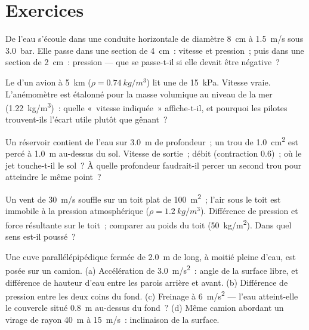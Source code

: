 \section{Exercices}

\begin{exercise}[$\star$]\label{exo:b2:euler-bernoulli:1}
De l'eau s'écoule dans une conduite horizontale de diamètre \qty{8}{cm} à \qty{1.5}{m/s}
sous \qty{3.0}{bar}. Elle passe dans une section de \qty{4}{cm}~: vitesse
et pression~; puis dans une section de \qty{2}{cm}~: pression --- que se passe-t-il
si elle devait être négative~?
\end{exercise}

\begin{exercise}[$\star$]\label{exo:b2:euler-bernoulli:2}
Le  d'un avion à \qty{5}{km} ($\rho = \qty{0.74}{kg/m^3}$)
lit une  de \qty{15}{kPa}. Vitesse vraie. L'anémomètre
est étalonné pour la masse volumique au niveau de la mer (\qty{1.22}{kg/m^3})~: quelle
«~vitesse indiquée~» affiche-t-il, et pourquoi les pilotes trouvent-ils l'écart
utile plutôt que gênant~?
\end{exercise}

\begin{exercise}[$\star$]\label{exo:b2:euler-bernoulli:3}
Un réservoir contient de l'eau sur \qty{3.0}{m} de profondeur~; un trou de \qty{1.0}{cm^2} est percé
à \qty{1.0}{m} au-dessus du sol. Vitesse de sortie~; débit (contraction $0.6$)~;
où le jet touche-t-il le sol~? À quelle profondeur faudrait-il percer un second trou
pour atteindre le même point~?
\end{exercise}

\begin{exercise}[$\star$]\label{exo:b2:euler-bernoulli:4}
Un vent de \qty{30}{m/s} souffle sur un toit plat de \qty{100}{m^2}~; l'air
sous le toit est immobile à la pression atmosphérique ($\rho = \qty{1.2}{kg/m^3}$).
Différence de pression et force résultante sur le toit~; comparer au poids
du toit (\qty{50}{kg/m^2}). Dans quel sens est-il poussé~?
\end{exercise}

\begin{exercise}[$\star\star$]\label{exo:b2:euler-bernoulli:5}
Une cuve parallélépipédique fermée de \qty{2.0}{m} de long, à moitié pleine d'eau, est posée sur un
camion. (a) Accélération de \qty{3.0}{m/s^2}~: angle de la surface libre,
et différence de hauteur d'eau entre les parois arrière et avant.
(b) Différence de pression entre les deux coins du fond. (c)
Freinage à \qty{6}{m/s^2} --- l'eau atteint-elle le couvercle situé \qty{0.8}{m} au-dessus
du fond~? (d) Même camion abordant un virage de rayon \qty{40}{m} à
\qty{15}{m/s}~: inclinaison de la surface.
\end{exercise}

